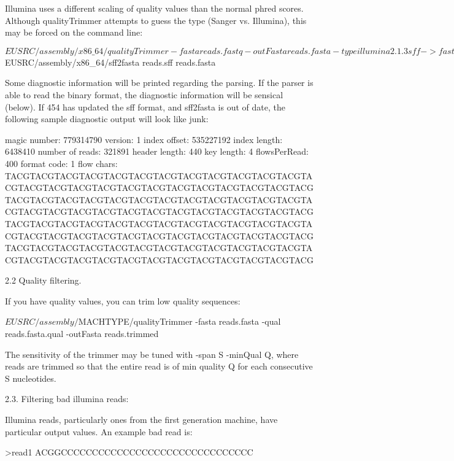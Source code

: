 \documentclass{article}[12pt]
\begin{document}
  Illumina uses a different scaling of quality values than the normal
  phred scores.  Although qualityTrimmer attempts to guess the type
  (Sanger vs. Illumina), this may be forced on the command line:

	${EUSRC}/assembly/x86\_64/qualityTrimmer	-fasta reads.fastq -outFasta reads.fasta -type illumina
	

2.1.3 sff -> fasta

  The 454 output files by default are in a binary format that contains
  both the fasta, quality, and flow values.  Newbler can take
  advantage of the flow values, but euler-sr does not.  To translate
  from sff to fasta, use sff2fasta

	${EUSRC}/assembly/x86\_64/sff2fasta reads.sff reads.fasta

	Some diagnostic information will be printed regarding the parsing.
	If the parser is able to read the binary format, the diagnostic
	information will be sensical (below). If 454 has updated the sff
	format, and sff2fasta is out of date, the following sample
	diagnostic output will look like junk:

magic number: 779314790
version: 1
index offset: 535227192
index length: 6438410
number of reads: 321891
header length: 440
key length: 4
flowsPerRead: 400
format code: 1
flow chars: TACGTACGTACGTACGTACGTACGTACGTACGTACGTACGTACGTACGTACGTACGTACGTACGTACGTACGTACGTACGTACGTACGTACGTACGTACGTACGTACGTACGTACGTACGTACGTACGTACGTACGTACGTACGTACGTACGTACGTACGTACGTACGTACGTACGTACGTACGTACGTACGTACGTACGTACGTACGTACGTACGTACGTACGTACGTACGTACGTACGTACGTACGTACGTACGTACGTACGTACGTACGTACGTACGTACGTACGTACGTACGTACGTACGTACGTACGTACGTACGTACGTACGTACGTACGTACGTACGTACGTACGTACGTACGTACGTACGTACGTACGTACGTACGTACGTACGTACGTACG

2.2  Quality filtering.
	
  If you have quality values, you can trim low quality sequences:

	${EUSRC}/assembly/${MACHTYPE}/qualityTrimmer -fasta reads.fasta	-qual reads.fasta.qual -outFasta reads.trimmed 

	The sensitivity of the trimmer may be tuned with -span S -minQual Q,
	where reads are trimmed so that the entire read is of min quality Q
	for each consecutive S nucleotides.
	

2.3. Filtering bad illumina reads:

	Illumina reads, particularly ones from the first generation machine,
	have particular output values.  An example bad read is:

>read1
ACGGCCCCCCCCCCCCCCCCCCCCCCCCCCCCCCC
\end{document}
